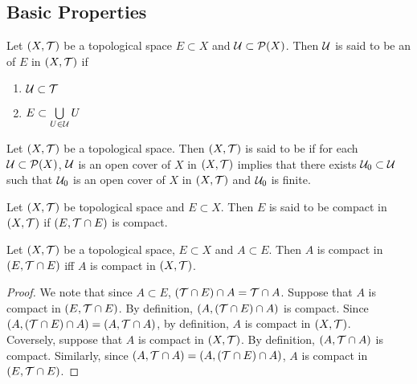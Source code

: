 \documentclass{book}
\begin{document}
	\subsection{Basic Properties}
	
	\begin{defn} 
		Let $(X, \mathcal{T})$ be a topological space $E \subset X$ and $\mathcal{U} \subset \mathcal{P}(X)$. Then $\mathcal{U}$ is said to be an  of $E$ in $(X, \mathcal{T})$ if 
		\begin{enumerate}
			\item $\mathcal{U} \subset \mathcal{T}$ 
			\item $E \subset \bigcup\limits_{U \in \mathcal{U}} U$
		\end{enumerate}
	\end{defn}

	\begin{defn} 
		Let $(X, \mathcal{T})$ be a topological space. Then $(X, \mathcal{T})$ is said to be  if for each $\mathcal{U} \subset \mathcal{P}(X)$, $\mathcal{U}$ is an open cover of $X$ in $(X, \mathcal{T})$ implies that there exists $\mathcal{U}_0 \subset \mathcal{U}$ such that $\mathcal{U}_0$ is an open cover of $X$ in $(X, \mathcal{T})$ and $\mathcal{U}_0$ is finite.
	\end{defn}

	\begin{defn} 
		Let $(X, \mathcal{T})$ be topological space and $E \subset X$. Then $E$ is said to be compact in $(X, \mathcal{T})$ if $(E, \mathcal{T} \cap E)$ is compact. 
	\end{defn}

	\begin{ex} 
		Let $(X, \mathcal{T})$ be a topological space, $E \subset X$ and $A \subset E$. Then $A$ is compact in $(E, \mathcal{T} \cap E)$ iff $A$ is compact in $(X, \mathcal{T})$.
	\end{ex}

	\begin{proof}
		We note that since $A \subset E$, $(\mathcal{T} \cap E) \cap A = \mathcal{T} \cap A$. Suppose that $A$ is compact in $(E, \mathcal{T} \cap E)$. By definition, $(A, (\mathcal{T} \cap E) \cap A)$ is compact. Since $(A, (\mathcal{T} \cap E) \cap A) = (A, \mathcal{T} \cap A)$, by definition, $A$ is compact in $(X, \mathcal{T})$.\\
		Coversely, suppose that $A$ is compact in $(X, \mathcal{T})$. By definition, $(A, \mathcal{T} \cap A)$ is compact. Similarly, since $ (A, \mathcal{T} \cap A) = (A, (\mathcal{T} \cap E) \cap A)$, $A$ is compact in $(E, \mathcal{T} \cap E)$.
	\end{proof}
\end{document}
